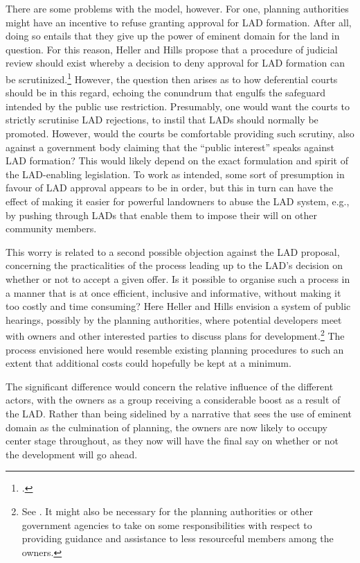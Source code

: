 There are some problems with the model, however. For one, planning authorities might have an incentive to refuse granting approval for LAD formation. After all, doing so entails that they give up the power of eminent domain for the land in question. For this reason, Heller and Hills propose that a procedure of judicial review should exist whereby a decision to deny approval for LAD formation can be scrutinized.\footcite[1490]{heller08} However, the question then arises as to how deferential  courts should be in this regard, echoing the conundrum that engulfs the safeguard intended by the public use restriction. Presumably, one would want the courts to strictly scrutinise LAD rejections, to instil that LADs should normally be promoted. However, would the courts be comfortable providing such scrutiny, also against a government body claiming that the ``public interest'' speaks against LAD formation? This would likely depend on the exact formulation and spirit of the LAD-enabling legislation. To work as intended, some sort of presumption in favour of LAD approval appears to be in order, but this in turn can have the effect of making it easier for powerful landowners to abuse the LAD system, e.g., by pushing through LADs that enable them to impose their will on other community members.

This worry is related to a second possible objection against the LAD proposal, concerning the practicalities of the process leading up to the LAD's decision on whether or not to accept a given offer. Is it possible to organise such a process in a manner that is at once efficient, inclusive and informative, without making it too costly and time consuming? Here Heller and Hills envision a system of public hearings, possibly  by the planning authorities, where potential developers meet with owners and other interested parties to discuss plans for development.\footnote{See \cite[1490-1491]{heller08}. It might also be necessary for the planning authorities or other government agencies to take on some responsibilities with respect to providing guidance and assistance to less resourceful members among the owners.} The process envisioned here would resemble existing planning procedures to such an extent that additional costs could hopefully be kept at a minimum. 

The significant difference would concern the relative influence of the different actors, with the owners as a group receiving a considerable boost as a result of the LAD. Rather than being sidelined by a narrative that sees the use of eminent domain as the culmination of planning, the owners are now likely to occupy center stage throughout, as they now will have the final say on whether or not the development will go ahead.

